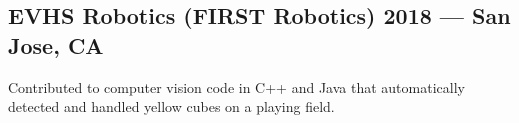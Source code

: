 \documentclass[../Resume.tex]{subfiles}
\begin{document}
	\subsection{EVHS Robotics (FIRST Robotics) \null\hfill 2018 --- San Jose, CA}
	\par Contributed to computer vision code in C++ and Java that automatically detected and handled yellow cubes on a playing field.
	\vspace*{-2mm}
\end{document}
